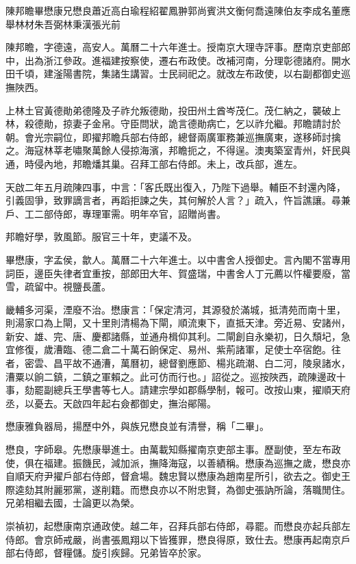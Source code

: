 
\begin{pinyinscope}
陳邦瞻畢懋康兄懋良蕭近高白瑜程紹翟鳳翀郭尚賓洪文衡何喬遠陳伯友李成名董應舉林材朱吾弼林秉漢張光前

陳邦瞻，字德遠，高安人。萬曆二十六年進士。授南京大理寺評事。歷南京吏部郎中，出為浙江參政。進福建按察使，遷右布政使。改補河南，分理彰德諸府。開水田千頃，建滏陽書院，集諸生講習。士民祠祀之。就改左布政使，以右副都御史巡撫陜西。

上林土官黃德勛弟德隆及子祚允叛德勛，投田州土酋岑茂仁。茂仁納之，襲破上林，殺德勛，掠妻子金帛。守臣問狀，詭言德勛病亡，乞以祚允繼。邦瞻請討於朝。會光宗嗣位，即擢邦瞻兵部右侍郎，總督兩廣軍務兼巡撫廣東，遂移師討擒之。海寇林莘老嘯聚萬餘人侵掠海濱，邦瞻扼之，不得逞。澳夷築室青州，奸民與通，時侵內地，邦瞻燔其巢。召拜工部右侍郎。未上，改兵部，進左。

天啟二年五月疏陳四事，中言：「客氏既出復入，乃陛下過舉。輔臣不封還內降，引義固爭，致罪謫言者，再蹈拒諫之失，其何解於人言？」疏入，忤旨譙讓。尋兼戶、工二部侍郎，專理軍需。明年卒官，詔贈尚書。

邦瞻好學，敦風節。服官三十年，吏議不及。

畢懋康，字孟侯，歙人。萬曆二十六年進士。以中書舍人授御史。言內閣不當專用詞臣，邊臣失律者宜重按，部郎田大年、賀盛瑞，中書舍人丁元薦以忤權要廢，當雪，疏留中。視鹽長蘆。

畿輔多河渠，湮廢不治。懋康言：「保定清河，其源發於滿城，抵清苑而南十里，則湯家口為上閘，又十里則清楊為下閘，順流東下，直抵天津。旁近易、安諸州，新安、雄、完、唐、慶都諸縣，並通舟楫仰其利。二閘創自永樂初，日久頹圮，急宜修復，歲漕臨、德二倉二十萬石餉保定、易州、紫荊諸軍，足使士卒宿飽。往者，密雲、昌平故不通漕，萬曆初，總督劉應節、楊兆疏潮、白二河，陵泉諸水，漕粟以餉二鎮，二鎮之軍賴之。此可仿而行也。」詔從之。巡按陜西，疏陳邊政十事，劾罷副總兵王學書等七人。請建宗學如郡縣學制，報可。改按山東，擢順天府丞，以憂去。天啟四年起右僉都御史，撫治鄖陽。

懋康雅負器局，揚歷中外，與族兄懋良並有清譽，稱「二畢」。

懋良，字師皋。先懋康舉進士。由萬載知縣擢南京吏部主事。歷副使，至左布政使，俱在福建。振饑民，減加派，撫降海寇，以善績稱。懋康為巡撫之歲，懋良亦自順天府尹擢戶部右侍郎，督倉場。魏忠賢以懋康為趙南星所引，欲去之。御史王際逵劾其附麗邪黨，遂削籍。而懋良亦以不附忠賢，為御史張訥所論，落職閒住。兄弟相繼去國，士論更以為榮。

崇禎初，起懋康南京通政使。越二年，召拜兵部右侍郎，尋罷。而懋良亦起兵部左侍郎。會京師戒嚴，尚書張鳳翔以下皆獲罪，懋良得原，致仕去。懋康再起南京戶部右侍郎，督糧儲。旋引疾歸。兄弟皆卒於家。


\end{pinyinscope}
